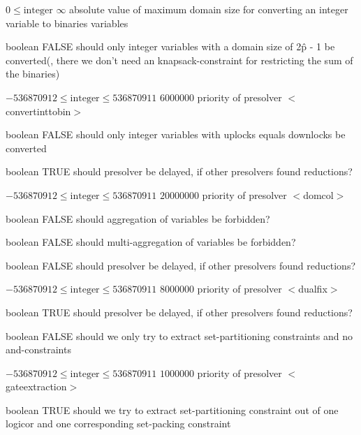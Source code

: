 %
{$0\leq\textrm{integer}$}%
{$\infty$}%
{absolute value of maximum domain size for converting an integer variable to binaries variables}%
{}

%
{boolean}%
{FALSE}%
{should only integer variables with a domain size of 2\^p - 1 be converted(, there we don't need an knapsack-constraint for restricting the sum of the binaries)}%
{}

%
{$-536870912\leq\textrm{integer}\leq536870911$}%
{$6000000$}%
{priority of presolver $<$convertinttobin$>$}%
{}

%
{boolean}%
{FALSE}%
{should only integer variables with uplocks equals downlocks be converted}%
{}

%
{boolean}%
{TRUE}%
{should presolver be delayed, if other presolvers found reductions?}%
{}

%
{$-536870912\leq\textrm{integer}\leq536870911$}%
{$20000000$}%
{priority of presolver $<$domcol$>$}%
{}

%
{boolean}%
{FALSE}%
{should aggregation of variables be forbidden?}%
{}

%
{boolean}%
{FALSE}%
{should multi-aggregation of variables be forbidden?}%
{}

%
{boolean}%
{FALSE}%
{should presolver be delayed, if other presolvers found reductions?}%
{}

%
{$-536870912\leq\textrm{integer}\leq536870911$}%
{$8000000$}%
{priority of presolver $<$dualfix$>$}%
{}

%
{boolean}%
{TRUE}%
{should presolver be delayed, if other presolvers found reductions?}%
{}

%
{boolean}%
{FALSE}%
{should we only try to extract set-partitioning constraints and no and-constraints}%
{}

%
{$-536870912\leq\textrm{integer}\leq536870911$}%
{$1000000$}%
{priority of presolver $<$gateextraction$>$}%
{}

%
{boolean}%
{TRUE}%
{should we try to extract set-partitioning constraint out of one logicor and one corresponding set-packing constraint}%
{}

